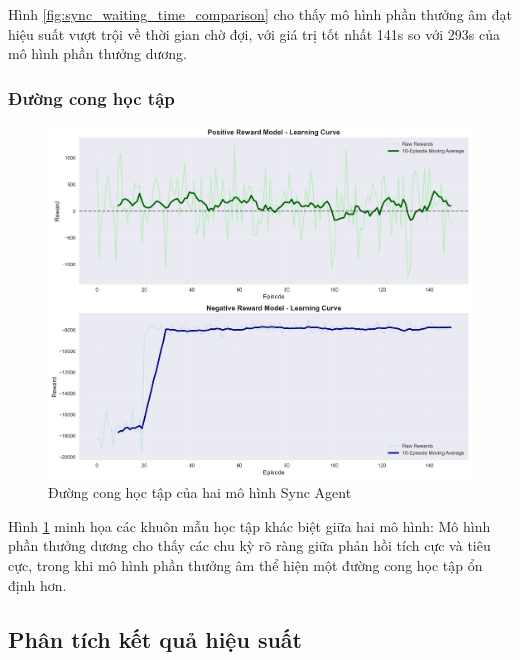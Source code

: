 Hình \ref{fig:sync_waiting_time_comparison} cho thấy mô hình phần thưởng âm đạt hiệu suất vượt trội về thời gian chờ đợi, với giá trị tốt nhất 141s so với 293s của mô hình phần thưởng dương.

\subsubsection{Đường cong học tập}

\begin{figure}[!htp]
    \centering
    \includegraphics[width=\textwidth]{figures/sync_learning_curves.png}
    \caption{Đường cong học tập của hai mô hình Sync Agent}
    \label{fig:sync_learning_curves}
\end{figure}
Hình \ref{fig:sync_learning_curves} minh họa các khuôn mẫu học tập khác biệt
giữa hai mô hình: Mô hình phần thưởng dương cho thấy các chu kỳ rõ ràng giữa phản hồi tích cực và tiêu cực, trong khi mô hình phần thưởng âm thể hiện một đường cong học tập ổn định hơn.

\subsection{Phân tích kết quả hiệu suất}

